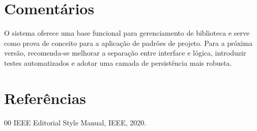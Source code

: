 \documentclass[conference]{IEEEtran}
\begin{document}
\section{Comentários}
O sistema oferece uma base funcional para gerenciamento de biblioteca e serve como prova de conceito para a aplicação de padrões de projeto.
Para a próxima versão, recomenda-se melhorar a separação entre interface e lógica, introduzir testes automatizados e adotar uma camada de persistência mais robusta.

\section{Referências}
\begin{thebibliography}{00}
IEEE Editorial Style Manual, IEEE, 2020.
\end{thebibliography}
\end{document}
